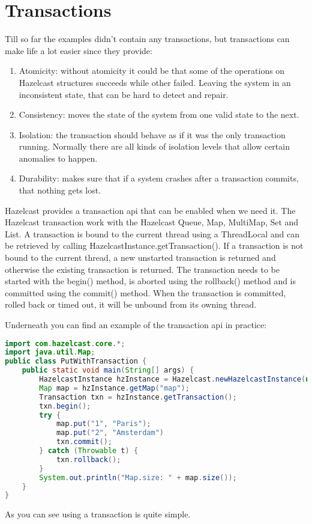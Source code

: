 \chapter{Transactions}
Till so far the examples didn't contain any transactions, but transactions can make life a lot easier since they provide:
\begin{enumerate}
\item Atomicity: without atomicity it could be that some of the operations on Hazelcast structures succeeds while other failed. Leaving the system in an inconsistent state, that can be hard to detect and repair.
\item Consistency: moves the state of the system from one valid state to the next.
\item Isolation: the transaction should behave as if it was the only transaction running. Normally there are all kinds of isolation levels that allow certain anomalies to happen.
\item Durability: makes sure that if a system crashes after a transaction commits, that nothing gets lost. 
\end{enumerate}
Hazelcast provides a transaction api that can be enabled when we need it. The Hazelcast transaction work with the Hazelcast Queue, Map, MultiMap, Set and List. A transaction is bound to the current thread using a ThreadLocal and can be retrieved by calling HazelcastInstance.getTransaction(). If a transaction is not bound to the current thread, a new unstarted transaction is returned and otherwise the existing transaction is returned. The transaction needs to be started with the begin() method, is aborted using the rollback() method and is committed using the commit() method. When the transaction is committed, rolled back or timed out, it will be unbound from its owning thread.

Underneath you can find an example of the transaction api in practice:
\begin{lstlisting}[language=java]
import com.hazelcast.core.*;
import java.util.Map;
public class PutWithTransaction {
    public static void main(String[] args) {
        HazelcastInstance hzInstance = Hazelcast.newHazelcastInstance(null);
        Map map = hzInstance.getMap("map");
        Transaction txn = hzInstance.getTransaction();
        txn.begin();
        try {
            map.put("1", "Paris");
            map.put("2", "Amsterdam")
            txn.commit();
        } catch (Throwable t) {
            txn.rollback();
        }
        System.out.println("Map.size: " + map.size());
    }
}
\end{lstlisting}
As you can see using a transaction is quite simple.

